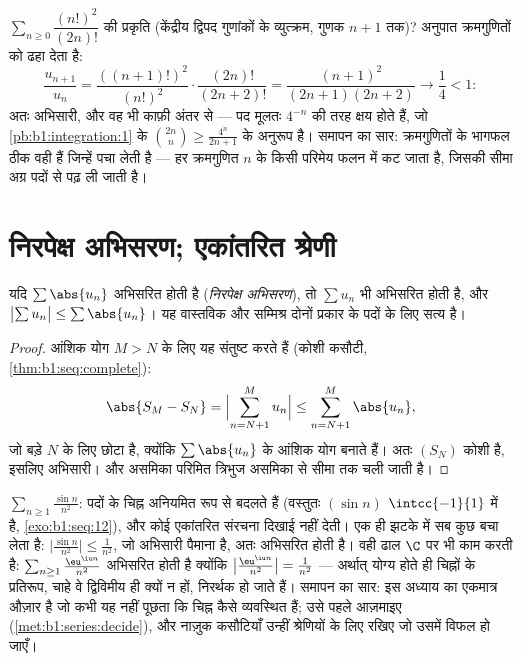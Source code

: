 \begin{example}[क्रमगुणितों की लड़ाई पर अनुपात कसौटी]\label{ex:b1:series:ratiobinom}
$\sum_{n\geq0} \dfrac{(n!)^2}{(2n)!}$ की प्रकृति (केंद्रीय द्विपद गुणांकों
के व्युत्क्रम, गुणक $n + 1$ तक)? अनुपात क्रमगुणितों को ढहा देता है:
\[
\frac{u_{n+1}}{u_n}
= \frac{((n+1)!)^2}{(n!)^2}\cdot\frac{(2n)!}{(2n+2)!}
= \frac{(n+1)^2}{(2n+1)(2n+2)}
\longrightarrow \frac14 < 1 :
\]
अतः अभिसारी, और वह भी काफ़ी अंतर से --- पद मूलतः $4^{-n}$ की तरह क्षय होते
हैं, जो \cref{pb:b1:integration:1} के $\binom{2n}{n} \geq \frac{4^n}{2n+1}$
के अनुरूप है। समापन का सार: क्रमगुणितों के भागफल ठीक वही हैं जिन्हें  पचा लेती है --- हर क्रमगुणित $n$ के किसी परिमेय फलन में कट जाता है,
जिसकी सीमा अग्र पदों से पढ़ ली जाती है।
\end{example}

\section{निरपेक्ष अभिसरण; एकांतरित श्रेणी}

\begin{theorem}[निरपेक्ष अभिसरण]\label{thm:b1:series:absolute}
यदि $\sum \abs{u_n}$ अभिसरित होती है (\emph{निरपेक्ष अभिसरण}), तो $\sum u_n$ भी अभिसरित होती है, और $\bigl|\sum u_n\bigr| \leq
\sum \abs{u_n}$। यह वास्तविक और सम्मिश्र दोनों प्रकार के पदों के लिए सत्य
है।
\end{theorem}

\begin{proof}
आंशिक योग $M > N$ के लिए यह संतुष्ट करते हैं (कोशी कसौटी,
\cref{thm:b1:seq:complete}):
\[
\abs{S_M - S_N} = \Bigl| \sum_{n=N+1}^{M} u_n \Bigr|
\leq \sum_{n=N+1}^{M} \abs{u_n},
\]
जो बड़े $N$ के लिए छोटा है, क्योंकि $\sum\abs{u_n}$ के आंशिक योग  बनाते हैं। अतः $(S_N)$ कोशी है, इसलिए अभिसारी। और असमिका परिमित
त्रिभुज असमिका से सीमा तक चली जाती है।
\end{proof}

\begin{example}[निरपेक्ष अभिसरण, वास्तविक और सम्मिश्र]\label{ex:b1:series:absexamples}
$\sum_{n\geq1} \frac{\sin n}{n^2}$: पदों के चिह्न अनियमित रूप से बदलते हैं
(वस्तुतः $(\sin n)$ $\intcc{-1}{1}$ में  है, \cref{exo:b1:seq:12}), और
कोई एकांतरित संरचना दिखाई नहीं देती।  एक ही झटके में सब कुछ
बचा लेता है: $\bigl|\frac{\sin n}{n^2}\bigr| \leq \frac{1}{n^2}$, जो अभिसारी
पैमाना है, अतः  अभिसरित होती है। वही ढाल $\C$ पर भी काम करती है:
$\sum_{n\geq1}\frac{\eu^{\iu n}}{n^2}$ अभिसरित होती है क्योंकि
$\bigl|\frac{\eu^{\iu n}}{n^2}\bigr| = \frac{1}{n^2}$ --- अर्थात् 
योग्य होते ही चिह्नों के प्रतिरूप, चाहे वे द्विविमीय ही क्यों न हों, निरर्थक
हो जाते हैं। समापन का सार: इस अध्याय का एकमात्र औज़ार  है जो
कभी यह नहीं पूछता कि चिह्न कैसे व्यवस्थित हैं; उसे पहले आज़माइए
(\cref{met:b1:series:decide}), और नाज़ुक कसौटियाँ उन्हीं श्रेणियों के लिए
रखिए जो उसमें विफल हो जाएँ।
\end{example}

